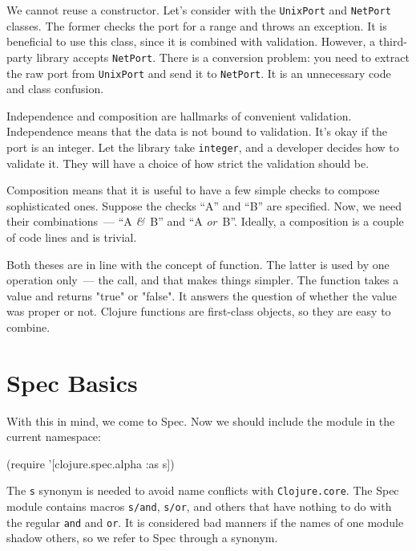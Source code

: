 We cannot reuse a constructor. Let's consider with the \verb|UnixPort| and \verb|NetPort| classes. The former checks the port for a range and throws an exception. It is beneficial to use this class, since it is combined with validation. However, a third-party library accepts \verb|NetPort|. There is a conversion problem: you need to extract the raw port from \verb|UnixPort| and send it to \verb|NetPort|. It is an unnecessary code and class confusion.


Independence and composition are hallmarks of convenient validation. Independence means that the data is not bound to validation. It's okay if the port is an integer. Let the library take \verb|integer|, and a developer decides how to validate it. They will have a choice of how strict the validation should be.


Composition means that it is useful to have a few simple checks to compose sophisticated ones. Suppose the checks “A” and “B” are specified. Now, we need their combinations~--- “A  \emph{&}~B” and “A \emph{or}~B”. Ideally, a composition is a couple of code lines and is trivial.


Both theses are in line with the concept of function.  The latter is used by one operation only~--- the call, and that makes things simpler. The function takes a value and returns "true" or "false". It answers the question of whether the value was proper or not. Clojure functions are first-class objects, so they are easy to combine. 

\section{Spec Basics} 

With this in mind, we come to Spec. Now we should include the module in the current namespace:

\begin{english}
  \begin{clojure}
(require '[clojure.spec.alpha :as s])
  \end{clojure}
\end{english}

The \verb|s| synonym is needed to avoid name conflicts with \verb|Clojure.core|. The Spec module contains macros \verb|s/and|, \verb|s/or|, and others that have nothing to do with the regular \verb|and| and \verb|or|. It is considered bad manners if the names of one module shadow others, so we refer to Spec through a synonym.

